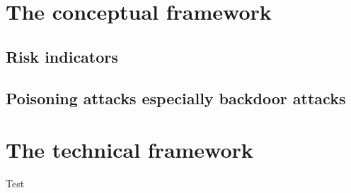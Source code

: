 \section{The conceptual framework}
\label{sec:conFrame}

\subsection{Risk indicators}
\label{sec:risk_indicators}

\subsection{Poisoning attacks especially backdoor attacks}

\newpage

\section{The technical framework}
\label{sec:techFrame}

Test
